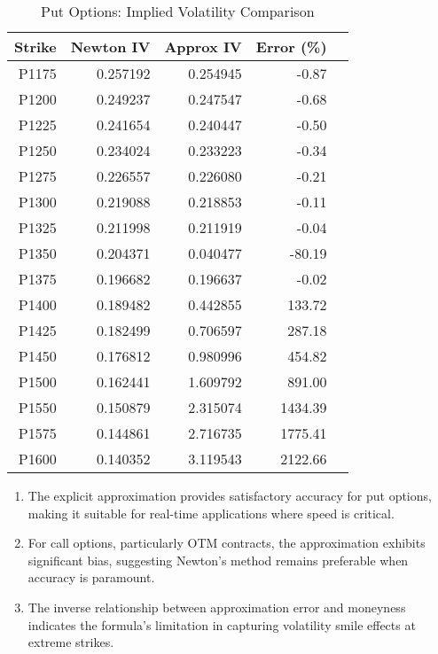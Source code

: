 \documentclass{article}
\begin{document}
\begin{table}[htbp]
    \centering
    \caption{Put Options: Implied Volatility Comparison}
    \label{tab:put_iv}
    \begin{tabular}{rrrrr}
        \toprule
        Strike & {Newton IV} & {Approx IV} & {Error (\%)} \\
        \midrule
        P1175  & 0.257192    & 0.254945    & -0.87        \\
        P1200  & 0.249237    & 0.247547    & -0.68        \\
        P1225  & 0.241654    & 0.240447    & -0.50        \\
        P1250  & 0.234024    & 0.233223    & -0.34        \\
        P1275  & 0.226557    & 0.226080    & -0.21        \\
        P1300  & 0.219088    & 0.218853    & -0.11        \\
        P1325  & 0.211998    & 0.211919    & -0.04        \\
        P1350  & 0.204371    & 0.040477    & -80.19       \\
        P1375  & 0.196682    & 0.196637    & -0.02        \\
        P1400  & 0.189482    & 0.442855    & 133.72       \\
        P1425  & 0.182499    & 0.706597    & 287.18       \\
        P1450  & 0.176812    & 0.980996    & 454.82       \\
        P1500  & 0.162441    & 1.609792    & 891.00       \\
        P1550  & 0.150879    & 2.315074    & 1434.39      \\
        P1575  & 0.144861    & 2.716735    & 1775.41      \\
        P1600  & 0.140352    & 3.119543    & 2122.66      \\
        \bottomrule
    \end{tabular}
\end{table}

\begin{enumerate}
    \item The explicit approximation provides satisfactory accuracy for put options, making it suitable for real-time applications where speed is critical.

    \item For call options, particularly OTM contracts, the approximation exhibits significant bias, suggesting Newton's method remains preferable when accuracy is paramount.

    \item The inverse relationship between approximation error and moneyness indicates the formula's limitation in capturing volatility smile effects at extreme strikes.
\end{enumerate}
\end{document}
